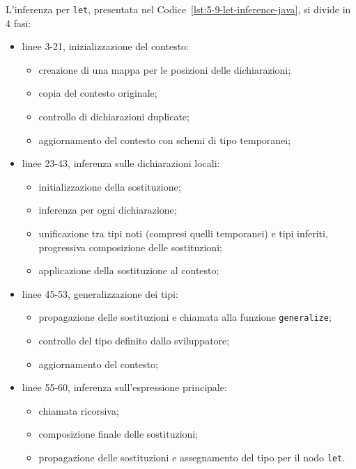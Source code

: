\noindent L'inferenza per \texttt{let}, presentata nel Codice~\ref{lst:5-9-let-inference-java}, si divide in 4 fasi:
\begin{itemize}
    \item linee 3-21, inizializzazione del contesto:
          \begin{itemize}
              \item creazione di una mappa per le posizioni delle dichiarazioni;
              \item copia del contesto originale;
              \item controllo di dichiarazioni duplicate;
              \item aggiornamento del contesto con schemi di tipo temporanei;
          \end{itemize}
    \item linee 23-43, inferenza sulle dichiarazioni locali:
          \begin{itemize}
              \item initializzazione della sostituzione;
              \item inferenza per ogni dichiarazione;
              \item unificazione tra tipi noti (compresi quelli temporanei) e tipi inferiti, progressiva composizione delle sostituzioni;
              \item applicazione della sostituzione al contesto;
          \end{itemize}
    \item linee 45-53, generalizzazione dei tipi:
          \begin{itemize}
              \item propagazione delle sostituzioni e chiamata alla funzione \texttt{generalize};
              \item controllo del tipo definito dallo sviluppatore;
              \item aggiornamento del contesto;
          \end{itemize}
    \item linee 55-60, inferenza sull'espressione principale:
          \begin{itemize}
              \item chiamata ricorsiva;
              \item composizione finale delle sostituzioni;
              \item propagazione delle sostituzioni e assegnamento del tipo per il nodo \texttt{let}.
          \end{itemize}
\end{itemize}

